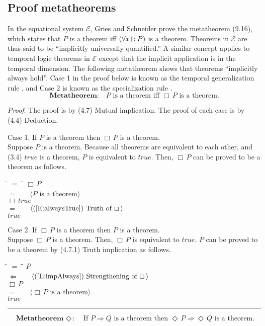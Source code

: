 \documentclass[12pt, fleqn, leqno]{article}
\newcommand{\lgap}{2pt}                             %
\newcommand{\mymathindent}{24pt}                    %
\newcommand{\impl}{\ensuremath{\Rightarrow}}        %
\newcommand{\foll}{\ensuremath{\Leftarrow}}         %
\newcommand{\Event}{\Diamond\,}
\newcommand{\Always}{\Box\,}
\newcommand{\myqed}{\rule[-.23ex]{1.2ex}{2.0ex}}
\newcommand{\myqedtab}{\hspace{384pt}}              %
\newcommand{\thedr}{\rule[-.25ex]{.32mm}{1.75ex}}   %
\newcommand{\drrb}{\;\thedr\,{:}\;}                 %
\newcommand{\all}{\forall}                          %
\newcommand{\Gll} {\langle}                         %
\newcommand{\Ggg} {\rangle}                         %
\newcommand{\Hint}[1]     {\ \ \ $\Gll              \mbox{#1} \Ggg$ }   %
\begin{document}
\subsection{Proof metatheorems}

In the equational system $\mathcal{E}$, Gries and Schneider \cite{LADM} prove the metatheorem (9.16), which states that
$P$ is a theorem iff $(\all x\drrb P)$ is a theorem.
Theorems in $\mathcal{E}$ are thus said to be ``implicitly universally quantified.''
A similar concept applies to temporal logic theorems in $\mathcal{E}$ except that the implicit application is in the temporal dimension.
The following metatheorem shows that theorems ``implicitly always hold''.
Case 1 in the proof below is known as the temporal generalization rule \cite{Schn}, and Case 2 is known as the specialization rule \cite{Manna}.
\begin{equation}\label{E:metatheorem}
\textbf{Metatheorem:}\quad P \text{ is a theorem iff } \Always P \text{ is a theorem.}
\end{equation}

\emph{Proof}: The proof is by (4.7) Mutual implication.
The proof of each case is by (4.4) Deduction.

Case 1. If $P$ is a theorem then $\Always P$ is a theorem.\\
Suppose $P$ is a theorem.
Because all theorems are equivalent to each other, and (3.4) $true$ is a theorem, $P$ is equivalent to $true$.
Then, $\Always P$ can be proved to be a theorem as follows.
\begin{tabbing}
\hspace{\mymathindent} \= $= \;$ \= \myqedtab \= \kill
\> \> $\Always P$\\[\lgap]
\> $=$ \> \Hint{$P$ is a theorem} \\[\lgap]
\> \> $\Always true$\\[\lgap]
\> $=$ \> \Hint{(\ref{E:alwaysTrue}) Truth of $\Always$} \\[\lgap]
\> \> $true$
\end{tabbing}

Case 2. If $\Always P$ is a theorem then $P$ is a theorem.\\
Suppose $\Always P$ is a theorem.
Then, $\Always P$ is equivalent to $true$.
$P$ can be proved to be a theorem by (4.7.1) Truth implication as follows.
\begin{tabbing}
\hspace{\mymathindent} \= $= \;$ \= \myqedtab \= \kill
\> \> $P$\\[\lgap]
\> $\foll$ \> \Hint{(\ref{E:impAlways}) Strengthening of $\Always$} \\[\lgap]
\> \> $\Always P$\\[\lgap]
\> $=$ \> \Hint{$\Always P$ is a theorem} \\[\lgap]
\> \> $true$ \quad \myqed
\end{tabbing}
\begin{equation}\label{E:metaEvent}
\textbf{Metatheorem $\Event$:}\quad \text{If } P\impl Q \text{ is a theorem then } \Event P\impl\Event Q \text{ is a theorem.}
\end{equation}
\end{document}
